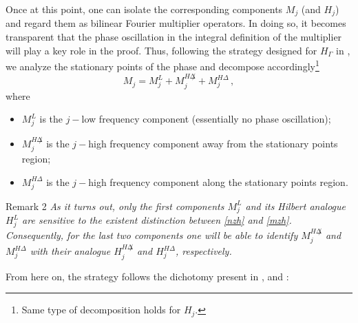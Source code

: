 \documentclass{amsart}
\def\G{\Gamma}
\theoremstyle{definition}
\theoremstyle{remark}
\numberwithin{equation}{section}
\begin{document}
Once at this point, one can isolate the corresponding components $M_j$ (and $H_j$) and regard them as bilinear Fourier multiplier operators. In doing so, it becomes transparent that the phase oscillation in the integral definition of the multiplier will play a key role in the proof. Thus, following the strategy designed for $H_{\G}$ in \cite{lie2015boundedness}, we analyze the stationary points of the phase and decompose accordingly\footnote{Same type of decomposition holds for $H_j$.}
\begin{equation}\label{multiplierM}
 M_j=M_j^L+M_j^{H\not\Delta}+M_j^{H\Delta}\,,
\end{equation}
where
\begin{itemize}
\item $M_j^L$ is the $j-$low frequency component (essentially no phase oscillation);

\item $M_j^{H\not\Delta}$ is the $j-$high frequency component away from the stationary points region;

\item $M_j^{H\Delta}$ is the $j-$high frequency component along the stationary points region.
\end{itemize}

\noindent \textsf{Remark 2} \emph{As it turns out, only the first components $M_j^L$ and its Hilbert analogue $H_j^L$ are sensitive to the existent distinction
between \eqref{nzh} and \eqref{mzh}. Consequently, for the last two components one will be able to identify $M_j^{H\not\Delta}$ and $M_j^{H\Delta}$ with their analogue $H_j^{H\not\Delta}$ and $H_j^{H\Delta}$, respectively.}

From here on, the strategy follows the dichotomy present in \cite{lie2015boundedness}, \cite{lie2015triangle} and \cite{lie2019unifiedap}:
\end{document}
